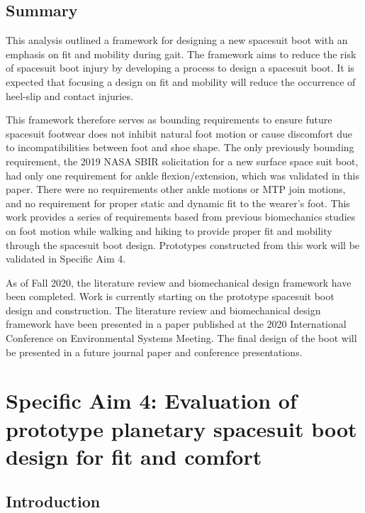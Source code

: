 \documentclass[defaultstyle,11pt]{comps}
\begin{document}
\hypertarget{summary-4}{%
\section{Summary}\label{summary-4}}

This analysis outlined a framework for designing a new spacesuit boot with an emphasis on fit and mobility during gait.
The framework aims to reduce the risk of spacesuit boot injury by developing a process to design a spacesuit boot.
It is expected that focusing a design on fit and mobility will reduce the occurrence of heel-slip and contact injuries.

This framework therefore serves as bounding requirements to ensure future spacesuit footwear does not inhibit natural foot motion or cause discomfort due to incompatibilities between foot and shoe shape.
The only previously bounding requirement, the 2019 NASA SBIR solicitation for a new surface space suit boot, had only one requirement for ankle flexion/extension, which was validated in this paper.
There were no requirements other ankle motions or MTP join motions, and no requirement for proper static and dynamic fit to the wearer's foot.
This work provides a series of requirements based from previous biomechanics studies on foot motion while walking and hiking to provide proper fit and mobility through the spacesuit boot design.
Prototypes constructed from this work will be validated in Specific Aim 4.

As of Fall 2020, the literature review and biomechanical design framework have been completed.
Work is currently starting on the prototype spacesuit boot design and construction.
The literature review and biomechanical design framework have been presented in a paper published at the 2020 International Conference on Environmental Systems Meeting.
The final design of the boot will be presented in a future journal paper and conference presentations.

\hypertarget{specific-aim-4-evaluation-of-prototype-planetary-spacesuit-boot-design-for-fit-and-comfort}{%
\chapter{Specific Aim 4: Evaluation of prototype planetary spacesuit boot design for fit and comfort}\label{specific-aim-4-evaluation-of-prototype-planetary-spacesuit-boot-design-for-fit-and-comfort}}

\hypertarget{introduction-3}{%
\section{Introduction}\label{introduction-3}}
\end{document}

